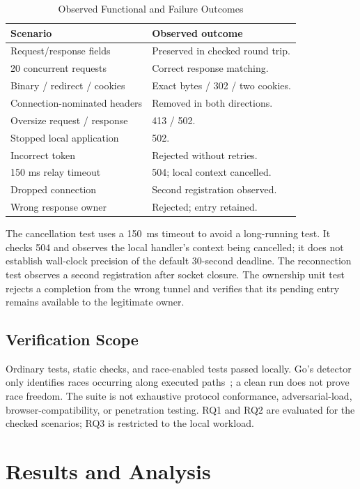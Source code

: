 \documentclass[conference,letterpaper]{IEEEtran}
\begin{document}
\begin{table}[!t]
\caption{Observed Functional and Failure Outcomes}
\label{tab:functional}
\centering\footnotesize
\setlength{\tabcolsep}{4pt}
\begin{tabularx}{\columnwidth}{@{}p{}Y@{}}
\toprule
\textbf{Scenario} & \textbf{Observed outcome}\\
\midrule
Request/response fields & Preserved in checked round trip.\\
20 concurrent requests & Correct response matching.\\
Binary / redirect / cookies & Exact bytes / 302 / two cookies.\\
Connection-nominated headers & Removed in both directions.\\
Oversize request / response & 413 / 502.\\
Stopped local application & 502.\\
Incorrect token & Rejected without retries.\\
150 ms relay timeout & 504; local context cancelled.\\
Dropped connection & Second registration observed.\\
Wrong response owner & Rejected; entry retained.\\
\bottomrule
\end{tabularx}
\end{table}

The cancellation test uses a 150~ms timeout to avoid a long-running test. It
checks 504 and observes the local handler's context being cancelled; it does
not establish wall-clock precision of the default 30-second deadline. The
reconnection test observes a second registration after socket closure. The
ownership unit test rejects a completion from the wrong tunnel and verifies
that its pending entry remains available to the legitimate owner.

\subsection{Verification Scope}
Ordinary tests, static checks, and race-enabled tests passed locally. Go's
detector only identifies races occurring along executed paths~\cite{race}; a
clean run does not prove race freedom. The suite is not exhaustive protocol
conformance, adversarial-load, browser-compatibility, or penetration testing.
RQ1 and RQ2 are evaluated for the checked scenarios; RQ3 is restricted to the
local workload.

\section{Results and Analysis}
\end{document}
